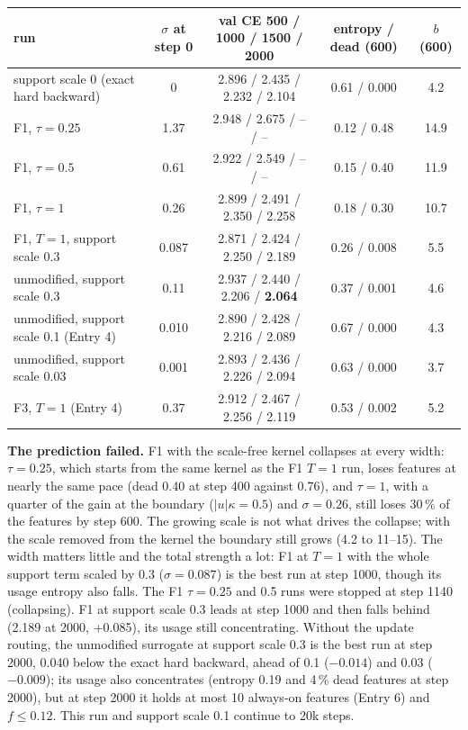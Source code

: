 \documentclass[11pt,a4paper]{article}
\begin{document}
\begin{center}\small
\begin{tabular}{lcccc}
\toprule
run & \(\sigma\) at step 0 & val CE 500 / 1000 / 1500 / 2000 & entropy / dead (600) & \(b\) (600) \\
\midrule
support scale 0 (exact hard backward)     & 0     & 2.896 / 2.435 / 2.232 / 2.104 & 0.61 / 0.000 & 4.2 \\
F1, \(\tau=0.25\)                         & 1.37  & 2.948 / 2.675 / -- / --       & 0.12 / 0.48 & 14.9 \\
F1, \(\tau=0.5\)                          & 0.61  & 2.922 / 2.549 / -- / --       & 0.15 / 0.40 & 11.9 \\
F1, \(\tau=1\)                            & 0.26  & 2.899 / 2.491 / 2.350 / 2.258 & 0.18 / 0.30 & 10.7 \\
F1, \(T=1\), support scale 0.3            & 0.087 & 2.871 / 2.424 / 2.250 / 2.189 & 0.26 / 0.008 & 5.5 \\
unmodified, support scale 0.3            & 0.11  & 2.937 / 2.440 / 2.206 / \textbf{2.064} & 0.37 / 0.001 & 4.6 \\
unmodified, support scale 0.1 (Entry 4)  & 0.010 & 2.890 / 2.428 / 2.216 / 2.089 & 0.67 / 0.000 & 4.3 \\
unmodified, support scale 0.03           & 0.001 & 2.893 / 2.436 / 2.226 / 2.094 & 0.63 / 0.000 & 3.7 \\
F3, \(T=1\) (Entry 4)                    & 0.37  & 2.912 / 2.467 / 2.256 / 2.119 & 0.53 / 0.002 & 5.2 \\
\bottomrule
\end{tabular}
\end{center}

\textbf{The prediction failed.}  F1 with the scale-free kernel collapses at every width: \(\tau=0.25\), which starts
from the same kernel as the F1 \(T=1\) run, loses features at nearly the same pace (dead 0.40 at step 400 against
0.76), and \(\tau=1\), with a quarter of the gain at the boundary (\(|u|\kappa=0.5\)) and \(\sigma=0.26\), still loses 30\,\%
of the features by step 600.  The growing scale is not what drives the collapse; with the scale removed from the
kernel the boundary still grows (4.2 to 11--15).  The width matters little and the total strength a lot: F1 at
\(T=1\) with the whole support term scaled by 0.3 (\(\sigma=0.087\)) is the best run at step 1000, though its usage
entropy also falls.  The F1 \(\tau=0.25\) and 0.5 runs were stopped at step 1140 (collapsing).  F1 at support scale 0.3 leads
at step 1000 and then falls behind (2.189 at 2000, +0.085), its usage still concentrating.  Without the update
routing, the unmodified surrogate at support scale 0.3 is the best run at step 2000, 0.040 below the exact hard
backward, ahead of 0.1 (\(-0.014\)) and 0.03 (\(-0.009\)); its usage also concentrates (entropy 0.19 and 4\,\% dead
features at step 2000), but at step 2000 it holds at most 10 always-on features (Entry 6) and \(f\le0.12\).  This
run and support scale 0.1 continue to 20k steps.
\end{document}
